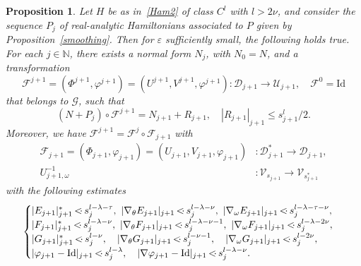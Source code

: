 \documentclass[JEP,XML,SOM,Unicode]{cedram}
\let\mathcal\mathscr
\numberwithin{equation}{section}
\theoremstyle{plain}
\newtheorem{proposition}[theorem]{Proposition}
\theoremstyle{definition}
\newcommand{\N}{\mathbb{N}}
\newcommand\MP{\,{<\hspace{-.5em}\cdot}\,}
\begin{document}
\begin{proposition}\label{iterative}
Let $H$ be as in~\eqref{Ham2} of class $C^l$ with $l>2\nu$, and consider the sequence $P_j$ of real-analytic Hamiltonians associated to $P$ given by Proposition~\ref{smoothing}. Then for $\varepsilon$ sufficiently small, the following holds true. For each $j \in \N$, there exists a normal form $N_{j}$, with $N_0=N$, and a transformation
\begin{equation}\label{fhaut}
\mathcal{F}^{j+1}=(\Phi^{j+1},\varphi^{j+1})=(U^{j+1},V^{j+1},\varphi^{j+1}) : \mathcal{D}_{j+1} \to \mathcal{U}_{j+1}, \quad \mathcal{F}^0=\mathrm{Id}
\end{equation}
that belongs to $\mathcal{G}$, such that
\begin{equation}\label{estim1iter}
(N+P_j) \circ \mathcal{F}^{j+1}=N_{j+1}+R_{j+1}, \quad |R_{j+1}|_{j+1} \leq s_{j+1}^l/2.
\end{equation}
Moreover, we have $\mathcal{F}^{j+1}=\mathcal{F}^{j} \circ \mathcal{F}_{j+1}$ with
\begin{equation}\label{fbas}
\begin{split}
\mathcal{F}_{j+1}=(\Phi_{j+1},\varphi_{j+1})=(U_{j+1},V_{j+1},\varphi_{j+1}) &: \mathcal{D}_{j+1}^* \to \mathcal{D}_{j+1}, \\
U_{j+1,\omega}^{-1} &: \mathcal{V}_{s_{j+1}} \to \mathcal{V}_{s_{j+1}^*}
\end{split}
\end{equation}
with the following estimates
\begin{equation}\label{estim2iter}
\begin{cases}
|E_{j+1}|_{j+1}^* \MP s_j^{l-\lambda-\tau}, \ |\nabla_\theta E_{j+1}|_{j+1} \MP s_j^{l-\lambda-\nu}, \ |\nabla_\omega E_{j+1}|_{j+1} \MP s_j^{l-\lambda-\tau-\nu},\\
|F_{j+1}|_{j+1}^* \MP s_j^{l-\lambda-\nu}, \ |\nabla_\theta F_{j+1}|_{j+1} \MP s_j^{l-\lambda-\nu-1}, \ |\nabla_\omega F_{j+1}|_{j+1} \MP s_j^{l-\lambda-2\nu}, \\
|G_{j+1}|_{j+1}^* \MP s_j^{l-\nu}, \quad |\nabla_\theta G_{j+1}|_{j+1} \MP s_j^{l-\nu-1}, \quad |\nabla_\omega G_{j+1}|_{j+1} \MP s_j^{l-2\nu}, \\
|\varphi_{j+1}-\mathrm{Id}|_{j+1} \MP s_j^{l-\lambda}, \quad |\nabla \varphi_{j+1}-\mathrm{Id}|_{j+1} \MP s_j^{l-\lambda-\nu}.
\end{cases}
\end{equation}
\end{proposition}
\end{document}
